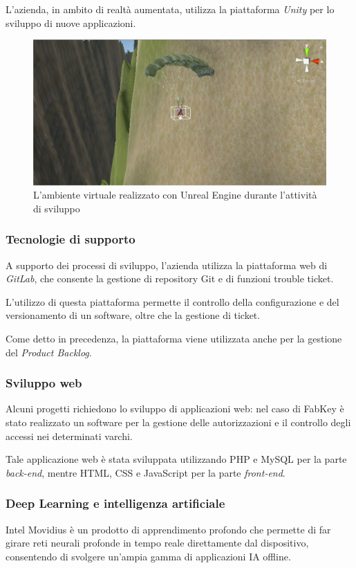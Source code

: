 L'azienda, in ambito di realtà aumentata, utilizza la piattaforma \textit{Unity} per lo sviluppo di nuove applicazioni.

\begin{figure}[H]
	\begin{center}
	\includegraphics[scale=0.22]{immagini/unity.png}
	\caption{L'ambiente virtuale realizzato con Unreal Engine durante l'attività di sviluppo}
	\end{center}
\end{figure}

\subsubsection{Tecnologie di supporto}
A supporto dei processi di sviluppo, l'azienda utilizza la piattaforma web di \textit{GitLab}, che consente la gestione di repository Git e di funzioni trouble ticket.

L'utilizzo di questa piattaforma permette il controllo della configurazione e del versionamento di un software, oltre che la gestione di ticket.

Come detto in precedenza, la piattaforma viene utilizzata anche per la gestione del \textit{Product Backlog}.

\subsubsection{Sviluppo web}
Alcuni progetti richiedono lo sviluppo di applicazioni web: nel caso di FabKey è stato realizzato un software per la gestione delle autorizzazioni e il controllo degli accessi nei determinati varchi.

Tale applicazione web è stata sviluppata utilizzando PHP e MySQL per la parte \textit{back-end}, mentre HTML, CSS e JavaScript per la parte \textit{front-end}.

\subsubsection{Deep Learning e intelligenza artificiale}
Intel Movidius è un prodotto di apprendimento profondo che permette di far girare reti neurali profonde in tempo reale direttamente dal dispositivo, consentendo di svolgere un'ampia gamma di applicazioni IA offline.

